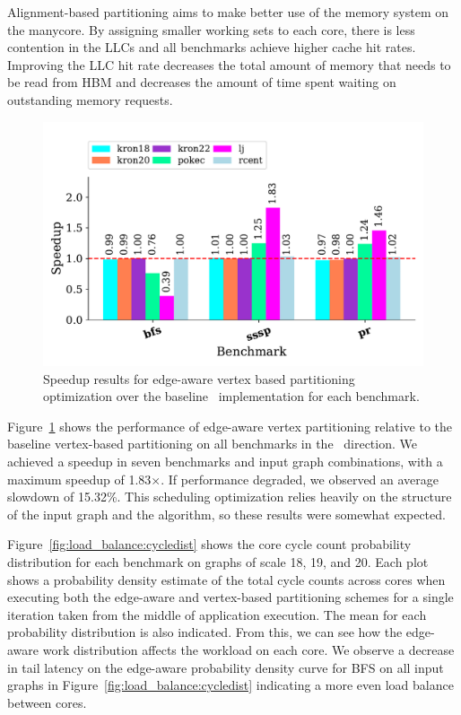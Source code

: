 Alignment-based partitioning aims to make better use of the memory system on the manycore. 
By assigning smaller working sets to each core, there is less contention in the LLCs and all benchmarks achieve higher cache hit rates. 
Improving the LLC hit rate decreases the total amount of memory that needs to be read from HBM and decreases the amount of time spent waiting on outstanding memory requests.
 
 
\begin{figure}[!ht]
    \centering
    \includegraphics[scale = 0.65]{graphit-figures/edge.pdf}
    \caption{Speedup results for edge-aware vertex based partitioning optimization over the baseline \pull~implementation for each benchmark.}
    \label{pap:generals:sec:eval:fig:edge}
\end{figure}

\edgeAwareHist
 
Figure~\ref{pap:generals:sec:eval:fig:edge} shows the performance of edge-aware vertex partitioning relative to the baseline vertex-based partitioning on all benchmarks in the \pull~direction. 
We achieved a speedup in seven benchmarks and input graph combinations, with a maximum speedup of 1.83$\times$.
If performance degraded, we observed an average slowdown of 15.32\%. 
This scheduling optimization relies heavily on the structure of the input graph and the algorithm, so these results were somewhat expected.

Figure~\ref{fig:load_balance:cycledist} shows the core cycle count probability distribution for each benchmark on \kron graphs of scale 18, 19, and 20.
Each plot shows a probability density estimate of the total cycle counts across cores when executing both the edge-aware and vertex-based partitioning schemes for a single iteration taken from the middle of application execution.
The mean for each probability distribution is also indicated.
From this, we can see how the edge-aware work distribution affects the workload on each core.
We observe a decrease in tail latency on the edge-aware probability density curve for BFS on all input graphs in Figure~\ref{fig:load_balance:cycledist} indicating a more even load balance between cores. 

